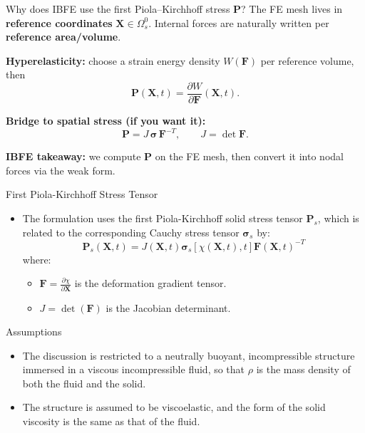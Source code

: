 \documentclass{beamer}
\begin{document}
\begin{frame}{Why does IBFE use the first Piola--Kirchhoff stress $\bm{P}$?}
\small
The FE mesh lives in \textbf{reference coordinates} \(\bm{X}\in \Omega_s^0\).
Internal forces are naturally written per \textbf{reference area/volume}.

\medskip
\textbf{Hyperelasticity:} choose a strain energy density \(W(\bm{F})\) per reference volume, then
\[
\bm{P}(\bm{X},t) = \frac{\partial W}{\partial \bm{F}}(\bm{X},t).
\]

\medskip
\textbf{Bridge to spatial stress (if you want it):}
\[
\bm{P} = J\,\boldsymbol{\sigma}\,\bm{F}^{-T},
\qquad J=\det\bm{F}.
\]

\medskip
\textbf{IBFE takeaway:} we compute \(\bm{P}\) on the FE mesh, then convert it into nodal forces via the weak form.
\end{frame}


\begin{frame}{First Piola-Kirchhoff Stress Tensor}
\begin{itemize}
\item The formulation uses the first Piola-Kirchhoff solid stress tensor $\mathbf{P}_s$, which is related to the corresponding Cauchy stress tensor $\boldsymbol{\sigma}_s$ by: 
\begin{equation*}
\mathbf{P}_s(\mathbf{X}, t) = J(\mathbf{X}, t) \boldsymbol{\sigma}_s[\chi(\mathbf{X}, t), t] \mathbf{F}(\mathbf{X}, t)^{-T}
\end{equation*}
where:
\begin{itemize}
\item $\mathbf{F} = \frac{\partial \chi}{\partial \mathbf{X}}$ is the deformation gradient tensor. 
\item $J = \det(\mathbf{F})$ is the Jacobian determinant. 
\end{itemize}
\end{itemize}
\end{frame}

\begin{frame}{Assumptions}
\begin{itemize}
\item The discussion is restricted to a neutrally buoyant, incompressible structure immersed in a viscous incompressible fluid, so that $\rho$ is the mass density of both the fluid and the solid. 
\item The structure is assumed to be viscoelastic, and the form of the solid viscosity is the same as that of the fluid. 
\end{itemize}
\end{frame}
\end{document}
